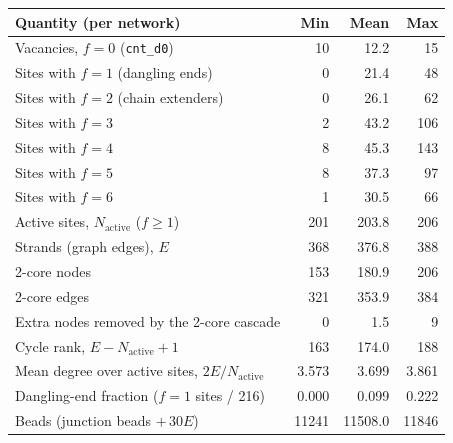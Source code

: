 \begin{tabular}{lrrr}
\toprule
Quantity (per network) & Min & Mean & Max \\
\midrule
Vacancies, $f=0$ (\texttt{cnt\_d0}) & 10 & 12.2 & 15 \\
Sites with $f=1$ (dangling ends) & 0 & 21.4 & 48 \\
Sites with $f=2$ (chain extenders) & 0 & 26.1 & 62 \\
Sites with $f=3$ & 2 & 43.2 & 106 \\
Sites with $f=4$ & 8 & 45.3 & 143 \\
Sites with $f=5$ & 8 & 37.3 & 97 \\
Sites with $f=6$ & 1 & 30.5 & 66 \\
Active sites, $N_\mathrm{active}$ ($f\geq1$) & 201 & 203.8 & 206 \\
Strands (graph edges), $E$ & 368 & 376.8 & 388 \\
2-core nodes & 153 & 180.9 & 206 \\
2-core edges & 321 & 353.9 & 384 \\
Extra nodes removed by the 2-core cascade & 0 & 1.5 & 9 \\
Cycle rank, $E-N_\mathrm{active}+1$ & 163 & 174.0 & 188 \\
Mean degree over active sites, $2E/N_\mathrm{active}$ & 3.573 & 3.699 & 3.861 \\
Dangling-end fraction ($f=1$ sites / 216) & 0.000 & 0.099 & 0.222 \\
Beads (junction beads $+\,30E$) & 11241 & 11508.0 & 11846 \\
\bottomrule
\end{tabular}

